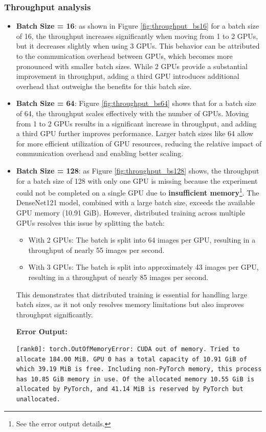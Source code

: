 \documentclass{article}
\begin{document}
\subsubsection{Throughput analysis}
\begin{itemize}
    \item \textbf{Batch Size = 16}: as shown in Figure \ref{fig:throughput_bs16} for a batch size of 16, the throughput increases significantly when moving from 1 to 2 GPUs, but it decreases slightly when using 3 GPUs. This behavior can be attributed to the communication overhead between GPUs, which becomes more pronounced with smaller batch sizes. While 2 GPUs provide a substantial improvement in throughput, adding a third GPU introduces additional overhead that outweighs the benefits for this batch size.
    
    \item \textbf{Batch Size = 64}: Figure \ref{fig:throughput_bs64} shows that for a batch size of 64, the throughput scales effectively with the number of GPUs. Moving from 1 to 2 GPUs results in a significant increase in throughput, and adding a third GPU further improves performance. Larger batch sizes like 64 allow for more efficient utilization of GPU resources, reducing the relative impact of communication overhead and enabling better scaling.

\item \textbf{Batch Size = 128}: as Figure \ref{fig:throughput_bs128} shows, the throughput for a batch size of 128 with only one GPU is missing because the experiment could not be completed on a single GPU due to \textbf{insufficient memory}\footnote{See the error output details.}. The DenseNet121 model, combined with a large batch size, exceeds the available GPU memory (10.91 GiB). However, distributed training across multiple GPUs resolves this issue by splitting the batch:
\begin{itemize}
    \item With 2 GPUs: The batch is split into 64 images per GPU, resulting in a throughput of nearly 55 images per second.
    \item With 3 GPUs: The batch is split into approximately 43 images per GPU, resulting in a throughput of nearly 85 images per second.
\end{itemize}
This demonstrates that distributed training is essential for handling large batch sizes, as it not only resolves memory limitations but also improves throughput significantly.


\textbf{Error Output:}
\begin{lstlisting}[basicstyle=\small\ttfamily, breaklines=true]
[rank0]: torch.OutOfMemoryError: CUDA out of memory. Tried to allocate 184.00 MiB. GPU 0 has a total capacity of 10.91 GiB of which 39.19 MiB is free. Including non-PyTorch memory, this process has 10.85 GiB memory in use. Of the allocated memory 10.55 GiB is allocated by PyTorch, and 41.14 MiB is reserved by PyTorch but unallocated.
\end{lstlisting}
\end{itemize}
\end{document}
